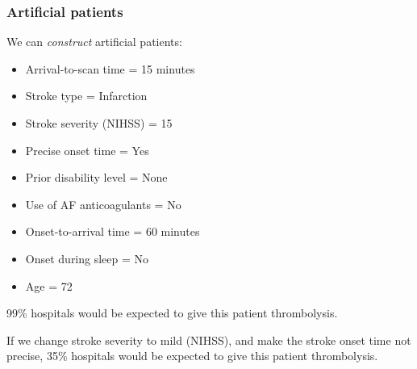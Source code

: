 \documentclass{beamer}
\begin{document}
\begin{frame}
\frametitle{Artificial patients}

We can \emph{construct} artificial patients:
\vspace{1mm}
\begin{footnotesize}
\begin{itemize}
    \item Arrival-to-scan time = 15 minutes 
    \item Stroke type  = Infarction
    \item Stroke severity (NIHSS) = 15
    \item Precise onset time = Yes
    \item Prior disability level = None
    \item Use of AF anticoagulants = No
    \item Onset-to-arrival time = 60 minutes
    \item Onset during sleep = No
    \item Age = 72
\end{itemize}
\end{footnotesize}

\vspace{2mm}

99\% hospitals would be expected to give this patient thrombolysis.

\vspace{2mm}

If we change stroke severity to mild (NIHSS), and make the stroke onset time not precise, 35\% hospitals would be expected to give this patient thrombolysis.

\end{frame}
\end{document}
